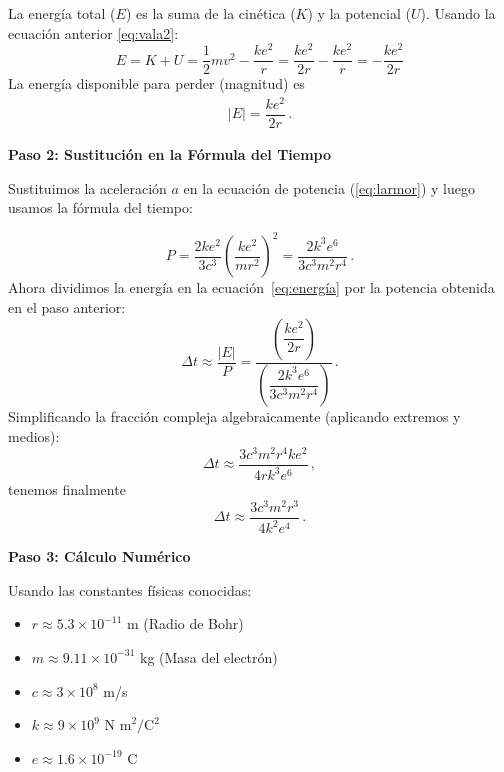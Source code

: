 \documentclass[11pt,a4paper]{book}
\begin{document}
La energía total ($E$) es la suma de la cinética ($K$) y la potencial ($U$). Usando la ecuación anterior \eqref{eq:vala2}:
\begin{equation}
\label{eq:HE}
    E = K + U = \frac{1}{2}mv^2 - \frac{k e^2}{r} = \frac{k e^2}{2r} - \frac{k e^2}{r} = -\frac{k e^2}{2r}
\end{equation}
La energía disponible para perder (magnitud) es 
\begin{align}
\label{eq:energía}
    |E| = \dfrac{k e^2}{2r}\,.
\end{align}

\textbf{Paso 2: Sustitución en la Fórmula del Tiempo}

Sustituimos la aceleración $a$ en la ecuación de potencia (\ref{eq:larmor}) y luego usamos la fórmula del tiempo:

\begin{equation}
    P = \frac{2 k e^2}{3 c^3} \left( \frac{k e^2}{m r^2} \right)^2 = \frac{2 k^3 e^6}{3 c^3 m^2 r^4}\,.
\end{equation}
%
Ahora dividimos la energía en la ecuación~\eqref{eq:energía} por la potencia obtenida en el paso anterior:
%
\begin{equation}
    \Delta t \approx \frac{|E|}{P} = \frac{\left( \dfrac{k e^2}{2 r} \right)}{\left( \dfrac{2 k^3 e^6}{3 c^3 m^2 r^4} \right)}\,.
\end{equation}
Simplificando la fracción compleja algebraicamente (aplicando extremos y medios):
\begin{equation}
    \Delta t \approx \frac{3c^3m^2r^4ke^2}{4rk^3e^6} \,,
\end{equation}
tenemos finalmente
\begin{equation}
    \Delta t \approx \frac{3 c^3 m^2 r^3}{4 k^2 e^4}\,.
\end{equation}

\textbf{Paso 3: Cálculo Numérico}

Usando las constantes físicas conocidas:
\begin{itemize}
    \item $r \approx 5.3 \times 10^{-11}$ m (Radio de Bohr)
    \item $m \approx 9.11 \times 10^{-31}$ kg (Masa del electrón)
    \item $c \approx 3 \times 10^8$ m/s
    \item $k \approx 9 \times 10^9 \text{ N m}^2/\text{C}^2$
    \item $e \approx 1.6 \times 10^{-19}$ C
\end{itemize}
\end{document}
